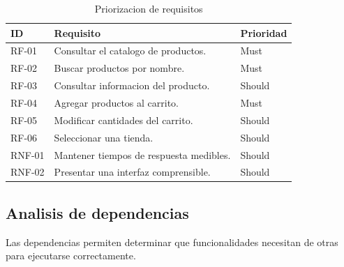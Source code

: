 \documentclass[11pt,a4paper]{article}
\begin{document}
\begin{table}[H]
\centering
\caption{Priorizacion de requisitos}
\small
\begin{tabularx}{\textwidth}{p{2cm}p{7cm}p{3cm}}
\toprule
\textbf{ID} &
\textbf{Requisito} &
\textbf{Prioridad} \\
\midrule

RF-01 & Consultar el catalogo de productos. & Must \\

RF-02 & Buscar productos por nombre. & Must \\

RF-03 & Consultar informacion del producto. & Should \\

RF-04 & Agregar productos al carrito. & Must \\

RF-05 & Modificar cantidades del carrito. & Should \\

RF-06 & Seleccionar una tienda. & Should \\

RNF-01 & Mantener tiempos de respuesta medibles. & Should \\

RNF-02 & Presentar una interfaz comprensible. & Should \\

\bottomrule
\end{tabularx}
\end{table}

\subsection{Analisis de dependencias}

Las dependencias permiten determinar que
funcionalidades necesitan de otras para
ejecutarse correctamente.
\end{document}
